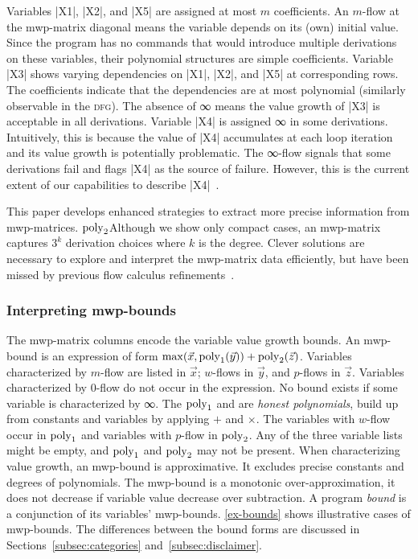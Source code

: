 \begin{example}
\noindent{}Variables \pr|X1|, \pr|X2|, and \pr|X5| are assigned at most \(m\){ }coefficients.
An \(m\)-flow at the mwp-matrix diagonal means the variable depends on its (own) initial value.
Since the program has no commands that would introduce multiple derivations on these variables, their polynomial structures are simple coefficients.
Variable \pr|X3| shows varying dependencies on \pr|X1|, \pr|X2|, and \pr|X5| at corresponding rows.
The coefficients indicate that the dependencies are at most polynomial (similarly observable in the \textsc{dfg}).
The absence of ∞ means the value growth of \pr|X3| is acceptable in all derivations.
Variable \pr|X4| is assigned ∞ in some derivations.
Intuitively, this is because the value of \pr|X4| accumulates at each loop iteration and its value growth is potentially problematic.
The ∞-flow signals that some derivations fail and flags \pr|X4| as the source of failure.
However, this is the current extent of our capabilities to describe \pr|X4|~\cite{aubert2023b}.
\end{example}

\noindent This paper develops enhanced strategies to extract more precise information from mwp-matrices.
$\operatorname{poly}_2$Although we show only compact cases, an mwp-matrix captures \(3^k\) derivation choices where \(k\) is the degree.
Clever solutions are necessary to explore and interpret the mwp-matrix data efficiently, but have been missed by previous flow calculus refinements~\cite{aubert20222,aubert2023b}.

\subsubsection{Interpreting mwp-bounds}
\label{subsec:interpreting-mwp-bounds}

The mwp-matrix columns encode the variable value growth bounds.
An mwp-bound is an expression of form $\max(\vec{x}, \operatorname{poly}_1(\vec{y})) + \operatorname{poly}_2(\vec{z})$.
Variables characterized by $m$-flow are listed in $\vec{x}$; $w$-flows in $\vec{y}$, and $p$-flows in $\vec{z}$.
Variables characterized by $0$-flow do not occur in the expression.
No bound exists if some variable is characterized by ∞.
The $\operatorname{poly}_1$ and  are \emph{honest polynomials}, build up from constants and variables by applying $+$ and $\times$. %
The variables with \(w\)-flow occur in $\operatorname{poly}_1$ and variables with \(p\)-flow in $\operatorname{poly}_2$.
Any of the three variable lists might be empty, and $\operatorname{poly}_1$ and $\operatorname{poly}_2$ may not be present.
When characterizing value growth, an mwp-bound is approximative.
It excludes precise constants and degrees of polynomials.
The mwp-bound is a monotonic over-approximation, \ie it does not decrease if variable value decrease over subtraction.
A program \emph{bound} is a conjunction of its variables' mwp-bounds.
\autoref{ex-bounds} shows illustrative cases of mwp-bounds.
The differences between the bound forms are discussed in Sections~\ref{subsec:categories} and~\ref{subsec:disclaimer}.

